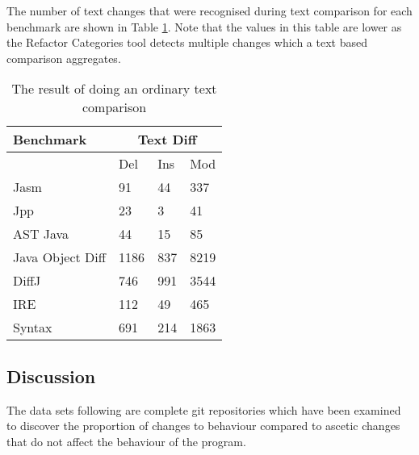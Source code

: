 The number of text changes that were recognised during text comparison for each benchmark are shown in Table \ref{tab:textcomp}. Note that the values in this table are lower as the Refactor Categories tool detects multiple changes which a text based comparison aggregates.  

\begin{table}[H]
    \centering
    \begin{tabular}{l|lll}
    Benchmark        & \multicolumn{3}{|c}{Text Diff} \\ \hline
    ~                & Del            & Ins & Mod  \\ \hline
    Jasm             & 91             & 44  & 337  \\
    Jpp              & 23             & 3   & 41   \\
    AST Java         & 44             & 15  & 85   \\
    Java Object Diff & 1186           & 837 & 8219 \\
    DiffJ            & 746            & 991 & 3544 \\
    IRE              & 112            & 49  & 465  \\
    Syntax           & 691            & 214 & 1863 \\
    \end{tabular}
    \caption{The result of doing an ordinary text comparison}
    \label{tab:textcomp}
\end{table}



\subsection{Discussion}

The data sets following are complete git repositories which have been examined to discover the proportion of changes to behaviour compared to ascetic changes that do not affect the behaviour of the program. 

% 
% 

